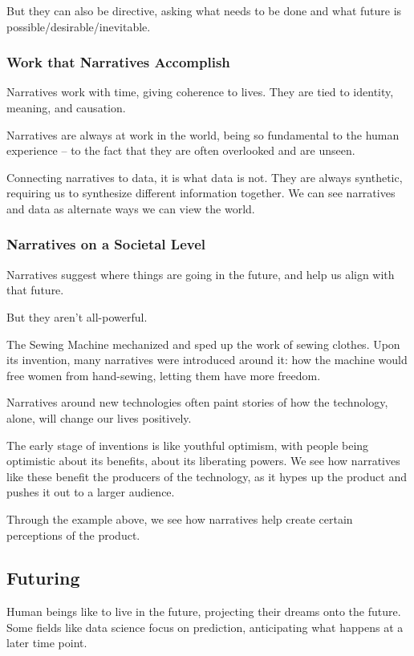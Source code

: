 \documentclass[openany]{book}
\begin{document}
But they can also be directive, asking what needs to be done and what future is possible/desirable/inevitable.

\subsubsection{Work that Narratives Accomplish}
Narratives work with time, giving coherence to lives. They are tied to identity, meaning, and causation.

Narratives are always at work in the world, being so fundamental to the human experience -- to the fact that they are often overlooked and are unseen.

Connecting narratives to data, it is what data is not. They are always synthetic, requiring us to synthesize different information together. We can see narratives and data as alternate ways we can view the world.

\subsubsection{Narratives on a Societal Level}
Narratives suggest where things are going in the future, and help us align with that future.

But they aren't all-powerful.

\begin{example}
	The Sewing Machine mechanized and sped up the work of sewing clothes. Upon its invention, many narratives were introduced around it: how the machine would free women from hand-sewing, letting them have more freedom.
\end{example}

Narratives around new technologies often paint stories of how the technology, alone, will change our lives positively.

The early stage of inventions is like youthful optimism, with people being optimistic about its benefits, about its liberating powers. We see how narratives like these benefit the producers of the technology, as it hypes up the product and pushes it out to a larger audience.

Through the example above, we see how narratives help create certain perceptions of the product.

\subsection{Futuring}
Human beings like to live in the future, projecting their dreams onto the future. Some fields like data science focus on prediction, anticipating what happens at a later time point.
\end{document}
